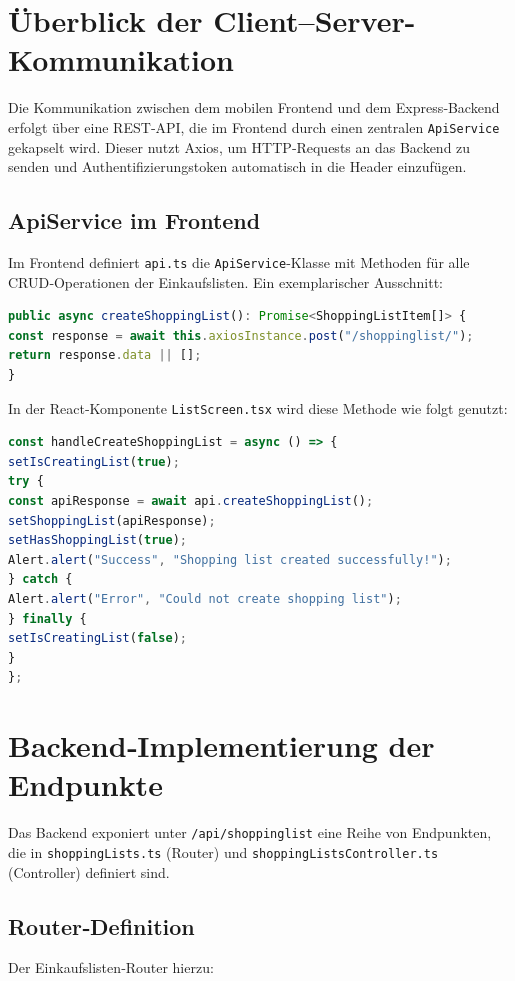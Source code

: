 \documentclass[12pt, a4paper]{report} %
\begin{document}
\section{Überblick der Client–Server-Kommunikation}
Die Kommunikation zwischen dem mobilen Frontend und dem Express‑Backend erfolgt über eine REST‑API, die im Frontend durch einen zentralen \texttt{ApiService} gekapselt wird. Dieser nutzt Axios, um HTTP‑Requests an das Backend zu senden und Authentifizierungs­token automatisch in die Header einzufügen.

\subsection{ApiService im Frontend}
Im Frontend definiert \texttt{api.ts} die \texttt{ApiService}-Klasse mit Methoden für alle CRUD‑Operationen der Einkaufslisten. Ein exemplarischer Ausschnitt:

\begin{lstlisting}[language=TypeScript,caption={Definition der \texttt{createShoppingList}-Methode im \texttt{ApiService}}]
public async createShoppingList(): Promise<ShoppingListItem[]> {
const response = await this.axiosInstance.post("/shoppinglist/");
return response.data || [];
}
\end{lstlisting}

In der React‑Komponente \texttt{ListScreen.tsx} wird diese Methode wie folgt genutzt:

\begin{lstlisting}[language=TypeScript,caption={Aufruf von \texttt{createShoppingList} im Frontend}]
const handleCreateShoppingList = async () => {
setIsCreatingList(true);
try {
const apiResponse = await api.createShoppingList();
setShoppingList(apiResponse);
setHasShoppingList(true);
Alert.alert("Success", "Shopping list created successfully!");
} catch {
Alert.alert("Error", "Could not create shopping list");
} finally {
setIsCreatingList(false);
}
};
\end{lstlisting}

\section{Backend‑Implementierung der Endpunkte}
Das Backend exponiert unter \texttt{/api/shoppinglist} eine Reihe von Endpunkten, die in \texttt{shoppingLists.ts} (Router) und \texttt{shoppingListsController.ts} (Controller) definiert sind.

\subsection{Router‑Definition}
Der Einkaufslisten‑Router hierzu:
\end{document}

